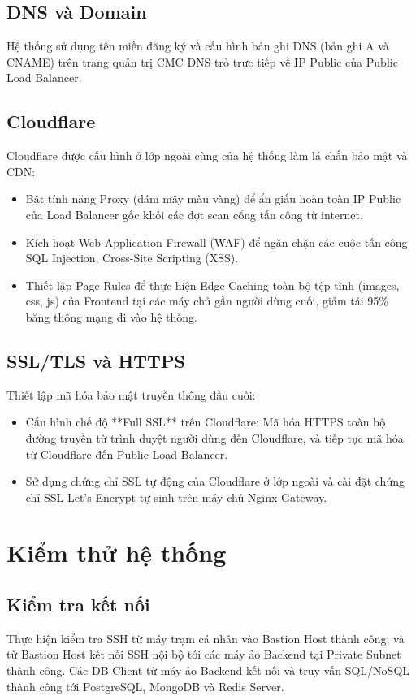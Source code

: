 \documentclass[12pt, a4paper]{article}
\begin{document}
\subsection{DNS và Domain}
Hệ thống sử dụng tên miền đăng ký và cấu hình bản ghi DNS (bản ghi A và CNAME) trên trang quản trị CMC DNS trỏ trực tiếp về IP Public của Public Load Balancer.

\subsection{Cloudflare}
Cloudflare được cấu hình ở lớp ngoài cùng của hệ thống làm lá chắn bảo mật và CDN:
\begin{itemize}
    \item Bật tính năng Proxy (đám mây màu vàng) để ẩn giấu hoàn toàn IP Public của Load Balancer gốc khỏi các đợt scan cổng tấn công từ internet.
    \item Kích hoạt Web Application Firewall (WAF) để ngăn chặn các cuộc tấn công SQL Injection, Cross-Site Scripting (XSS).
    \item Thiết lập Page Rules để thực hiện Edge Caching toàn bộ tệp tĩnh (images, css, js) của Frontend tại các máy chủ gần người dùng cuối, giảm tải 95\% băng thông mạng đi vào hệ thống.
\end{itemize}

\subsection{SSL/TLS và HTTPS}
Thiết lập mã hóa bảo mật truyền thông đầu cuối:
\begin{itemize}
    \item Cấu hình chế độ **Full SSL** trên Cloudflare: Mã hóa HTTPS toàn bộ đường truyền từ trình duyệt người dùng đến Cloudflare, và tiếp tục mã hóa từ Cloudflare đến Public Load Balancer.
    \item Sử dụng chứng chỉ SSL tự động của Cloudflare ở lớp ngoài và cài đặt chứng chỉ SSL Let's Encrypt tự sinh trên máy chủ Nginx Gateway.
\end{itemize}



\section{Kiểm thử hệ thống}

\subsection{Kiểm tra kết nối}
Thực hiện kiểm tra SSH từ máy trạm cá nhân vào Bastion Host thành công, và từ Bastion Host kết nối SSH nội bộ tới các máy ảo Backend tại Private Subnet thành công. Các DB Client từ máy ảo Backend kết nối và truy vấn SQL/NoSQL thành công tới PostgreSQL, MongoDB và Redis Server.
\end{document}
